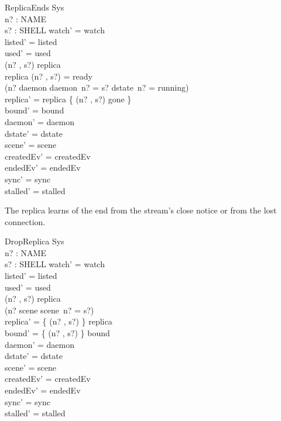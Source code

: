 \documentclass[a4paper,10pt,fleqn]{article}
\begin{document}
\begin{schema}{ReplicaEnds}
  \Delta Sys \\
  n? : NAME \\
  s? : SHELL
\where
  watch' = watch \\
  listed' = listed \\
  used' = used \\
  (n? , s?) \in \dom replica \\
  replica (n? , s?) = ready \\
  \lnot (n? \in \dom daemon \land daemon~n? = s? \land dstate~n? = running) \\
  replica' = replica \oplus \{ (n? , s?) \mapsto gone \} \\
  bound' = bound \\
  daemon' = daemon \\
  dstate' = dstate \\
  scene' = scene \\
  createdEv' = createdEv \\
  endedEv' = endedEv \\
  sync' = sync \\
  stalled' = stalled
\end{schema}

The replica learns of the end from the stream's close notice or from the
lost connection.

\begin{schema}{DropReplica}
  \Delta Sys \\
  n? : NAME \\
  s? : SHELL
\where
  watch' = watch \\
  listed' = listed \\
  used' = used \\
  (n? , s?) \in \dom replica \\
  \lnot (n? \in \dom scene \land scene~n? = s?) \\
  replica' = \{ (n? , s?) \} \ndres replica \\
  bound' = \{ (n? , s?) \} \ndres bound \\
  daemon' = daemon \\
  dstate' = dstate \\
  scene' = scene \\
  createdEv' = createdEv \\
  endedEv' = endedEv \\
  sync' = sync \\
  stalled' = stalled
\end{schema}
\end{document}
